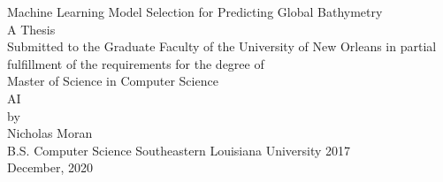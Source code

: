 \begin{titlepage}
    \begin{center}

        Machine Learning Model Selection for Predicting Global Bathymetry \\
        \vspace*{66pt}
        A Thesis\\
        \vspace*{66pt}
        Submitted to the Graduate Faculty of the  University of New Orleans  in partial fulfillment of the  requirements for the degree of \\
        \vspace*{66pt}
        Master of Science in Computer Science  \\
        AI \\
        \vspace*{66pt}
        by\\
        Nicholas Moran\\
        B.S. Computer Science Southeastern Louisiana University 2017\\
        December, 2020\\         
    \end{center}
 \end{titlepage}
